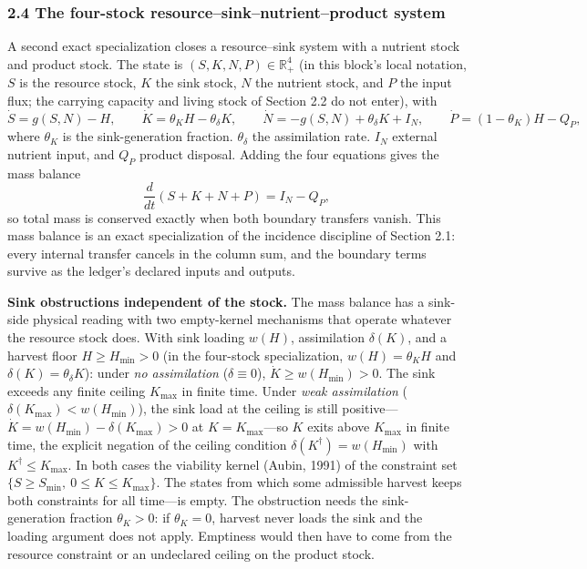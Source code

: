 \documentclass[11pt]{article}
\begin{document}
\subsubsection{2.4 The four-stock resource--sink--nutrient--product
system}\label{the-four-stock-resourcesinknutrientproduct-system}

A second exact specialization closes a resource--sink system with a nutrient stock and product stock. The state is \((S, K, N, P) \in \mathbb{R}^4_+\) (in this block's local notation, \(S\) is the resource stock, \(K\) the sink stock, \(N\) the nutrient stock, and \(P\) the input flux; the carrying capacity and living stock of Section 2.2 do not enter), with \[\dot S = g(S,N) - H, \qquad \dot K = \theta_K H - \theta_\delta K, \qquad \dot N = -g(S,N) + \theta_\delta K + I_N, \qquad \dot P = (1 - \theta_K)H - Q_P,\] where \(\theta_K\) is the sink-generation fraction. \(\theta_\delta\) the assimilation rate. \(I_N\) external nutrient input, and \(Q_P\) product disposal. Adding the four equations gives the mass balance \[\frac{d}{dt}(S + K + N + P) = I_N - Q_P,\] so total mass is conserved exactly when both boundary transfers vanish. This mass balance is an exact specialization of the incidence discipline of Section 2.1: every internal transfer cancels in the column sum, and the boundary terms survive as the ledger's declared inputs and outputs.

\textbf{Sink obstructions independent of the stock.} The mass balance has a sink-side physical reading with two empty-kernel mechanisms that operate whatever the resource stock does. With sink loading \(w(H)\), assimilation \(\delta(K)\), and a harvest floor \(H \ge H_{\min} > 0\) (in the four-stock specialization, \(w(H) = \theta_K H\) and \(\delta(K) = \theta_\delta K\)): under \emph{no assimilation} (\(\delta \equiv 0\)), \(\dot K \ge w(H_{\min}) > 0\). The sink exceeds any finite ceiling \(K_{\max}\) in finite time. Under \emph{weak
assimilation} (\(\delta(K_{\max}) < w(H_{\min})\)), the sink load at the ceiling is still positive---\(\dot K = w(H_{\min}) - \delta(K_{\max}) > 0\) at \(K = K_{\max}\)---so \(K\) exits above \(K_{\max}\) in finite time, the explicit negation of the ceiling condition \(\delta(K^\dagger) = w(H_{\min})\) with \(K^\dagger \le K_{\max}\). In both cases the viability kernel (Aubin, 1991) of the constraint set \(\{S \ge S_{\min},\ 0 \le K \le K_{\max}\}\). The states from which some admissible harvest keeps both constraints for all time---is empty. The obstruction needs the sink-generation fraction \(\theta_K > 0\): if \(\theta_K = 0\), harvest never loads the sink and the loading argument does not apply. Emptiness would then have to come from the resource constraint or an undeclared ceiling on the product stock.
\end{document}
